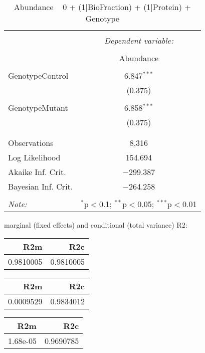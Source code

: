 \documentclass[11pt]{report}
\begin{document}
\begin{table}[!htbp] \centering 
  \caption{Abundance ~ 0 + (1|BioFraction) + (1|Protein) + Genotype} 
  \label{} 
\begin{tabular}{@{\extracolsep{5pt}}lc} 
\\[-1.8ex]\hline 
\hline \\[-1.8ex] 
 & \multicolumn{1}{c}{\textit{Dependent variable:}} \\ 
\cline{2-2} 
\\[-1.8ex] & Abundance \\ 
\hline \\[-1.8ex] 
 GenotypeControl & 6.847$^{***}$ \\ 
  & (0.375) \\ 
  & \\ 
 GenotypeMutant & 6.858$^{***}$ \\ 
  & (0.375) \\ 
  & \\ 
\hline \\[-1.8ex] 
Observations & 8,316 \\ 
Log Likelihood & 154.694 \\ 
Akaike Inf. Crit. & $-$299.387 \\ 
Bayesian Inf. Crit. & $-$264.258 \\ 
\hline 
\hline \\[-1.8ex] 
\textit{Note:}  & \multicolumn{1}{r}{$^{*}$p$<$0.1; $^{**}$p$<$0.05; $^{***}$p$<$0.01} \\ 
\end{tabular} 
\end{table} 
marginal (fixed effects) and conditional (total variance) R2:

\begin{tabular}{r|r}
\hline
R2m & R2c\\
\hline
0.9810005 & 0.9810005\\
\hline
\end{tabular}

\begin{tabular}{r|r}
\hline
R2m & R2c\\
\hline
0.0009529 & 0.9834012\\
\hline
\end{tabular}

\begin{tabular}{r|r}
\hline
R2m & R2c\\
\hline
1.68e-05 & 0.9690785\\
\hline
\end{tabular}
\end{document}

